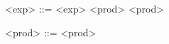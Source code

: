 \begin{grammarEx}
	<exp> ::= <exp> \lit{+} <prod>
	\alt <prod>
	
	<prod> ::= <prod> \lit{*} 
	\alt {}
\end{grammarEx}